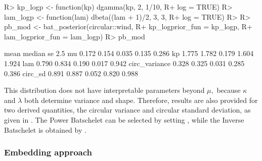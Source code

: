 \begin{CodeChunk}

\begin{CodeInput}
R> kp_logp  <- function(kp) dgamma(kp, 2, 1/10, 
R+                                 log = TRUE)
R> lam_logp <- function(lam) dbeta((lam + 1)/2, 3, 3, 
R+                                 log = TRUE)
R> 
R> pb_mod <- bat_posterior(circular::wind, 
R+                         kp_logprior_fun  = kp_logp,
R+                         lam_logprior_fun = lam_logp)
R> pb_mod
\end{CodeInput}

\begin{CodeOutput}
               mean median    se  2.5%
mu            0.172  0.154 0.035 0.135 0.286
kp            1.775  1.782 0.179 1.604 1.924
lam           0.790  0.834 0.190 0.017 0.942
circ_variance 0.328  0.325 0.031 0.285 0.386
circ_sd       0.891  0.887 0.052 0.820 0.988
\end{CodeOutput}
\end{CodeChunk}

This distribution does not have interpretable parameters beyond \(\mu,\)
because \(\kappa\) and \(\lambda\) both determine variance and shape.
Therefore, results are also provided for two derived quantities, the
circular variance and circular standard deviation, as given in
\citep{fisher1995statistical}. The Power Batschelet can be selected by
setting , while the Inverse Batschelet is
obtained by .

\hypertarget{embedding-approach}{%
\subsubsection{Embedding approach}\label{embedding-approach}}

\label{sec:embed}

